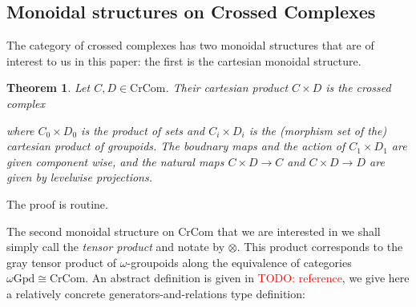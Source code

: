 \documentclass[12pt]{article}
\newtheorem{theorem}{Theorem}[section]
\theoremstyle{definition}
\newcommand{\TODO}[1]{\textcolor{red}{TODO: {#1}}}
\newcommand{\stinfty}{\omega\text{Gpd}}
\newcommand{\crcom}{\text{CrCom}}
\begin{document}
\subsection{Monoidal structures on Crossed Complexes} 
The category of crossed complexes has two monoidal structures that are of interest to us in this paper: the first is the cartesian monoidal structure.
\begin{theorem}
	Let $C,D \in \crcom$. Their cartesian product $C \times D$ is the crossed complex
	\begin{center}
	\end{center}
	where $C_0 \times D_0$ is the product of sets and $C_i \times D_i$ is the (morphism set of the) cartesian product of groupoids. The boudnary maps and the action of $C_1 \times D_1$ are given component wise, and the natural maps $C \times D \to C$ and $C \times D \to D$ are given by levelwise projections.
\end{theorem}
The proof is routine. 
\par The second monoidal structure on $\crcom$ that we are interested in we shall simply call the \textit{tensor product} and notate by $\otimes$. This product corresponds to the gray tensor product of $\omega$-groupoids along the equivalence of categories $\stinfty \cong \crcom$. An abstract definition is given in \TODO{reference}, we give here a relatively concrete generators-and-relations type definition:
\end{document}
